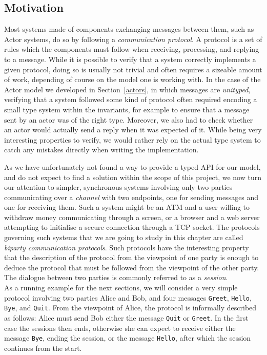 \documentclass[a4paper,twoside]{article}
\newcommand{\RefSec}[1]{Section~\ref{#1}}
\newcommand{\stt}[1]{\texttt{\small{#1}}}
\begin{document}
\subsection{Motivation}
\label{sess-mot}

Most systems made of components exchanging messages between them, such as Actor systems, do so by following a \textit{communication protocol}. A protocol is a set of rules which the components must follow when receiving, processing, and replying to a message. While it is possible to verify that a system correctly implements a given protocol, doing so is usually not trivial and often requires a sizeable amount of work, depending of course on the model one is working with. In the case of the Actor model we developed in \RefSec{actors}, in which messages are \textit{unityped}, verifying that a system followed some kind of protocol often required encoding a small type system within the invariants, for example to ensure that a message sent by an actor was of the right type. Moreover, we also had to check whether an actor would actually send a reply when it was expected of it. While being very interesting properties to verify, we would rather rely on the actual type system to catch any mistakes directly when writing the implementation.

As we have unfortunately not found a way to provide a typed API for our model, and do not expect to find a solution within the scope of this project, we now turn our attention to simpler, synchronous systems involving only two parties communicating over a \textit{channel} with two endpoints, one for sending messages and one for receiving them. Such a system might be an ATM and a user willing to withdraw money communicating through a screen, or a browser and a web server attempting to initialise a secure connection through a TCP socket. The protocols governing such systems that we are going to study in this chapter are called \textit{biparty communication protocols}. Such protocols have the interesting property that the description of the protocol from the viewpoint of one party is enough to deduce the protocol that must be followed from the viewpoint of the other party. The dialogue between two parties is commonly referred to as a \textit{session}.\\

As a running example for the next sections, we will consider a very simple protocol involving two parties Alice and Bob, and four messages \stt{Greet}, \stt{Hello}, \stt{Bye}, and \stt{Quit}.
From the viewpoint of Alice, the protocol is informally described as follows: Alice must send Bob either the message \stt{Quit} or \stt{Greet}. In the first case the sessions then ends, otherwise she can expect to receive either the message \stt{Bye}, ending the session, or the message \stt{Hello}, after which the session continues from the start.\\
\end{document}
